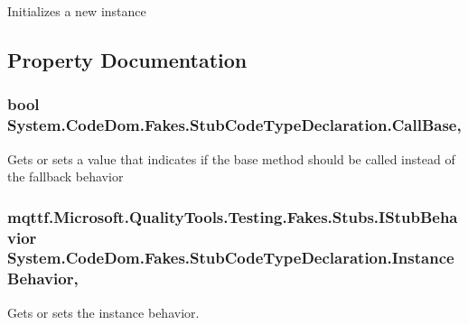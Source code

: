 Initializes a new instance



\subsection{Property Documentation}
\hypertarget{class_system_1_1_code_dom_1_1_fakes_1_1_stub_code_type_declaration_a83c8d6302fa0e49746095b31002cb4b1}{
\subsubsection[{Call\-Base}]{\setlength{\rightskip}{0pt plus 5cm}bool System.\-Code\-Dom.\-Fakes.\-Stub\-Code\-Type\-Declaration.\-Call\-Base\hspace{0.3cm}{\ttfamily [get]}, {\ttfamily [set]}}}\label{class_system_1_1_code_dom_1_1_fakes_1_1_stub_code_type_declaration_a83c8d6302fa0e49746095b31002cb4b1}


Gets or sets a value that indicates if the base method should be called instead of the fallback behavior

\hypertarget{class_system_1_1_code_dom_1_1_fakes_1_1_stub_code_type_declaration_ae5ab494efdee1402bb4268787abfd93c}{
\subsubsection[{Instance\-Behavior}]{\setlength{\rightskip}{0pt plus 5cm}mqttf.\-Microsoft.\-Quality\-Tools.\-Testing.\-Fakes.\-Stubs.\-I\-Stub\-Behavior System.\-Code\-Dom.\-Fakes.\-Stub\-Code\-Type\-Declaration.\-Instance\-Behavior\hspace{0.3cm}{\ttfamily [get]}, {\ttfamily [set]}}}\label{class_system_1_1_code_dom_1_1_fakes_1_1_stub_code_type_declaration_ae5ab494efdee1402bb4268787abfd93c}


Gets or sets the instance behavior.

